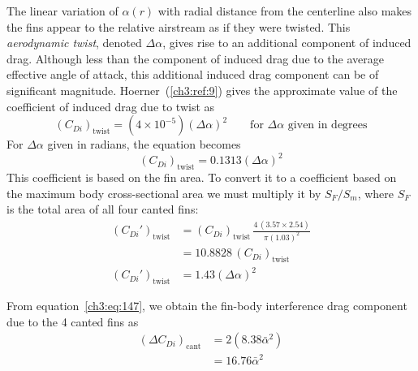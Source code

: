 The linear variation of $\alpha(r)$ with radial distance from the centerline also makes the fins
appear to the relative airstream as if they were twisted. This \emph{aerodynamic twist}, denoted
$\Delta\alpha$, gives rise to an additional component of induced drag. Although less than the
component of induced drag due to the average effective angle of attack, this additional induced
drag component can be of significant magnitude. Hoerner~(\ref{ch3:ref:9}) gives the approximate
value of the coefficient of induced drag due to twist as
\begin{equation*}
(C_{Di})_{\mathrm{twist}} = (4 \times 10^{-5})(\Delta\alpha)^{2}
\qquad \text{for $\Delta\alpha$ given in degrees}
\end{equation*}
For $\Delta\alpha$ given in radians, the equation becomes
\begin{equation*}
(C_{Di})_{\mathrm{twist}} = 0.1313(\Delta\alpha)^{2}
\end{equation*}
This coefficient is based on the fin area. To convert it to a coefficient based on the maximum body
cross-sectional area we must multiply it by $S_F/S_m$, where $S_F$ is the total area of all four
canted fins:
\begin{align*}
(C_{Di}')_{\mathrm{twist}} &= (C_{Di})_{\mathrm{twist}}\,\frac{4\,(3.57 \times 2.54)}{\pi(1.03)^{2}}\\
&= 10.8828\,(C_{Di})_{\mathrm{twist}}\\
(C_{Di}')_{\mathrm{twist}} &= 1.43(\Delta\alpha)^{2} \tag{155}
\end{align*}

From equation~\eqref{ch3:eq:147}, we obtain the fin-body interference drag component due to the 4
canted fins as
\begin{align*}
(\Delta C_{Di})_{\mathrm{cant}} &= 2(8.38\bar{\alpha}^{2})\\
&= 16.76\bar{\alpha}^{2}
\end{align*}

